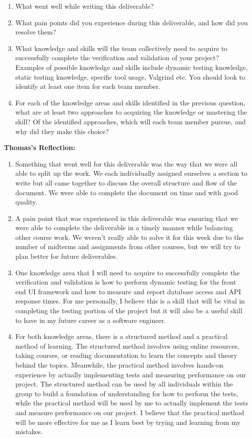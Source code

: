 \documentclass[12pt, titlepage]{article}
\begin{document}
\begin{enumerate}
  \item What went well while writing this deliverable? 
  \item What pain points did you experience during this deliverable, and how
    did you resolve them?
  \item What knowledge and skills will the team collectively need to acquire to
  successfully complete the verification and validation of your project?
  Examples of possible knowledge and skills include dynamic testing knowledge,
  static testing knowledge, specific tool usage, Valgrind etc.  You should look to
  identify at least one item for each team member.
  \item For each of the knowledge areas and skills identified in the previous
  question, what are at least two approaches to acquiring the knowledge or
  mastering the skill?  Of the identified approaches, which will each team
  member pursue, and why did they make this choice?
\end{enumerate}


\noindent\textbf{Thomas's Reflection:}
\begin{enumerate}
  \item Something that went well for this deliverable was the way that we were all able to split up the work.
  We each individually assigned ourselves a section to write but all came together to discuss the overall structure
  and flow of the document. We were able to complete the document on time and with good quality.
  \item A pain point that was experienced in this deliverable was ensuring that we were able to complete the deliverable
  in a timely manner while balancing other course work. We weren't really able to solve it for this week due to 
  the number of midterms and assignments from other courses, but we will try to plan better for future deliverables.
  \item One knowledge area that I will need to acquire to successfully complete the verification and validation is 
  how to perform dynamic testing for the front end UI framework and how to measure and report database access and API 
  response times. For me personally, I believe this is a skill that will be vital in completing the testing portion of 
  the project but it will also be a useful skill to have in my future career as a software engineer.
  \item For both knowledge areas, there is a structured method and a practical method of learning. The structured method
  involves using online resources, taking courses, or reading documentation to learn the concepts and theory behind the 
  topics. Meanwhile, the practical method involves hands-on experience by actually implementing tests and measuring performance
  on our project. The structured method can be used by all individuals within the group to build a foundation of understanding
  for how to perform the tests, while the practical method will be used by me to actually implement the tests and measure performance
  on our project. I believe that the practical method will be more effective for me as I learn best by trying and learning
  from my mistakes.
\end{enumerate}
\end{document}
